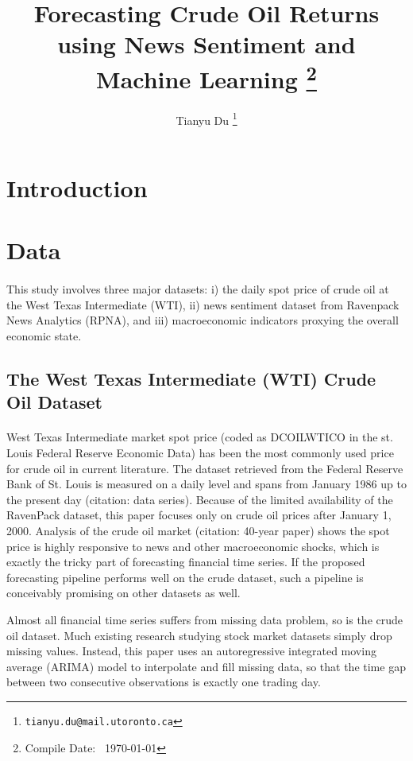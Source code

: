 \documentclass[12pt]{article}
\title{Forecasting Crude Oil Returns using News Sentiment and Machine Learning \footnote{Compile Date: \currenttime\ \today}}
\author{Tianyu Du \footnote{\texttt{tianyu.du@mail.utoronto.ca}}}
\begin{document}
	\maketitle
	\tableofcontents
	\newpage
	\section{Introduction}
	
	\section{Data}
	\paragraph{}This study involves three major datasets: i) the daily spot price of crude oil at the West Texas Intermediate (WTI), ii) news sentiment dataset from Ravenpack News Analytics (RPNA), and iii) macroeconomic indicators proxying the overall economic state.

	\subsection{The West Texas Intermediate (WTI) Crude Oil Dataset}
	\paragraph{}West Texas Intermediate market spot price (coded as DCOILWTICO in the st. Louis Federal Reserve Economic Data) has been the most commonly used price for crude oil in current literature. The dataset retrieved from the Federal Reserve Bank of St. Louis is measured on a daily level and spans from January 1986 up to the present day (citation: data series). Because of the limited availability of the RavenPack dataset, this paper focuses only on crude oil prices after January 1, 2000. Analysis of the crude oil market (citation: 40-year paper) shows the spot price is highly responsive to news and other macroeconomic shocks, which is exactly the tricky part of forecasting financial time series. If the proposed forecasting pipeline performs well on the crude dataset, such a pipeline is conceivably promising on other datasets as well.

	\par Almost all financial time series suffers from missing data problem, so is the crude oil dataset. Much existing research studying stock market datasets simply drop missing values. Instead, this paper uses an autoregressive integrated moving average (ARIMA) model to interpolate and fill missing data, so that the time gap between two consecutive observations is exactly one trading day. 
\end{document}
